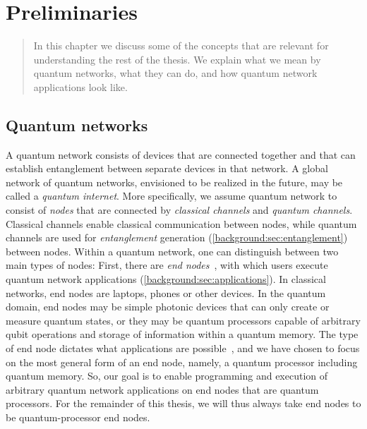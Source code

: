 \chapter
 [Preliminaries]
 {Preliminaries}
\label{chp:background}


\begin{abstract}
    In this chapter we discuss some of the concepts that are relevant for understanding the rest of the thesis.
    We explain what we mean by quantum networks, what they can do, and how quantum network applications look like.
\end{abstract}

\section{Quantum networks}

A quantum network consists of devices that are connected together and that can establish entanglement between separate devices in that network.
A global network of quantum networks, envisioned to be realized in the future, may be called a \emph{quantum internet}.
More specifically, we assume quantum network to consist of \textit{nodes} that are connected by \textit{classical channels} and \textit{quantum channels}.
Classical channels enable classical communication between nodes, while quantum channels are used for \textit{entanglement} generation (\cref{background:sec:entanglement}) between nodes.
Within a quantum network, one can distinguish between two main types of nodes: First, there are \emph{end nodes}~\cite{wehner_2018_stages}, with which users execute quantum network applications (\cref{background:sec:applications}).
In classical networks, end nodes are laptops, phones or other devices.
In the quantum domain, end nodes may be simple photonic devices that can only create or measure quantum states, or they may be quantum processors capable of arbitrary qubit operations and storage of information within a quantum memory.
The type of end node dictates what applications are possible~\cite{wehner_2018_stages}, and we have chosen to focus on the most general form of an end node, namely, a quantum processor including quantum memory.
So, our goal is to enable programming and execution of arbitrary quantum network applications on end nodes that are quantum processors.
For the remainder of this thesis, we will thus always take end nodes to be quantum-processor end nodes.

